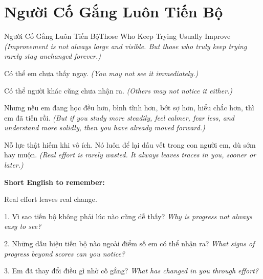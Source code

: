 \section{Người Cố Gắng Luôn Tiến Bộ}
\begin{truyen}{Người Cố Gắng Luôn Tiến Bộ}{Those Who Keep Trying Usually Improve}
\textit{(Improvement is not always large and visible. But those who truly keep trying rarely stay unchanged forever.)}

Có thể em chưa thấy ngay.
\textit{(You may not see it immediately.)}

Có thể người khác cũng chưa nhận ra.
\textit{(Others may not notice it either.)}

Nhưng nếu em đang học đều hơn, bình tĩnh hơn, bớt sợ hơn, hiểu chắc hơn, thì em đã tiến rồi.
\textit{(But if you study more steadily, feel calmer, fear less, and understand more solidly, then you have already moved forward.)}
\end{truyen}

\begin{baihoc}
Nỗ lực thật hiếm khi vô ích. Nó luôn để lại dấu vết trong con người em, dù sớm hay muộn.
\textit{(Real effort is rarely wasted. It always leaves traces in you, sooner or later.)}
\end{baihoc}

\begin{ghinhoanh}
\textbf{Short English to remember:}

Real effort leaves real change.

\end{ghinhoanh}

\begin{tuhocnhanh}
1. Vì sao tiến bộ không phải lúc nào cũng dễ thấy? \textit{Why is progress not always easy to see?}

2. Những dấu hiệu tiến bộ nào ngoài điểm số em có thể nhận ra? \textit{What signs of progress beyond scores can you notice?}

3. Em đã thay đổi điều gì nhờ cố gắng? \textit{What has changed in you through effort?}
\end{tuhocnhanh}
\ngancach
